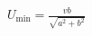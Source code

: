 \documentclass[border=2.5pt]{standalone}
\begin{document}
$\displaystyle \boxed{U_{\min}=\frac{vb}{\sqrt{a^2+b^2}}}$
\end{document}
